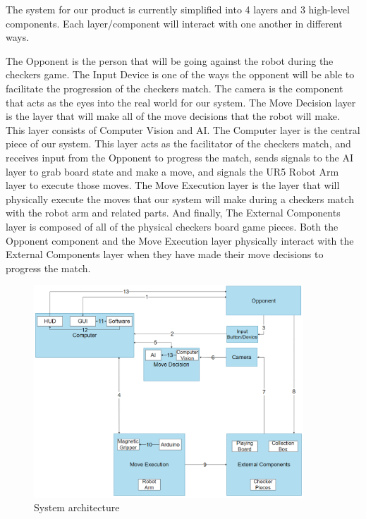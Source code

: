\begin{flushleft}
The system for our product is currently simplified into 4 layers and 3 high-level components. Each layer/component will interact with one another in different ways.
\end{flushleft}
\begin{flushleft}
The Opponent is the person that will be going against the robot during the checkers game. The Input Device is one of the ways the opponent will be able to facilitate the progression of the checkers match. The camera is the component that acts as the eyes into the real world for our system. The Move Decision layer is the layer that will make all of the move decisions that the robot will make. This layer consists of Computer Vision and AI. The Computer layer is the central piece of our system. This layer acts as the facilitator of the checkers match, and receives input from the Opponent to progress the match, sends signals to the AI layer to grab board state and make a move, and signals the UR5 Robot Arm layer to execute those moves. The Move Execution layer is the layer that will physically execute the moves that our system will make during a checkers match with the robot arm and related parts. And finally, The External Components layer is composed of all of the physical checkers board game pieces. Both the Opponent component and the Move Execution layer physically interact with the External Components layer when they have made their move decisions to progress the match.
\end{flushleft}

\begin{figure}[h!]
	\centering
 	\includegraphics[width=0.90\textwidth]{images/data_flow_actual}
 \caption{System architecture}
\end{figure}
